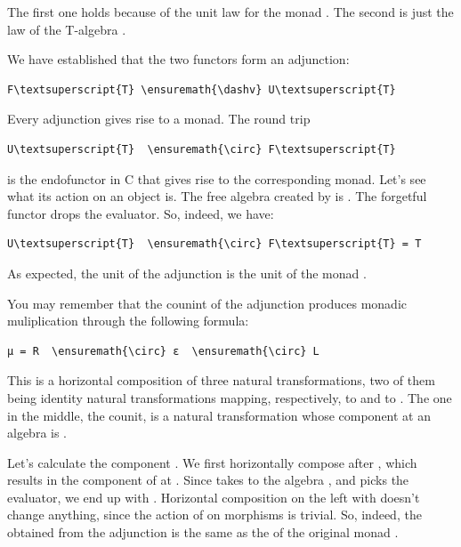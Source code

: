 \noindent
The first one holds because of the unit law for the monad .
The second is just the law of the T-algebra .

We have established that the two functors form an adjunction:

\begin{Verbatim}[commandchars=\\\{\}]
F\textsuperscript{T} \ensuremath{\dashv} U\textsuperscript{T}
\end{Verbatim}
Every adjunction gives rise to a monad. The round trip

\begin{Verbatim}[commandchars=\\\{\}]
U\textsuperscript{T}  \ensuremath{\circ} F\textsuperscript{T}
\end{Verbatim}
is the endofunctor in C that gives rise to the corresponding monad.
Let's see what its action on an object  is. The free algebra
created by  is . The forgetful functor
 drops the evaluator. So, indeed, we have:

\begin{Verbatim}[commandchars=\\\{\}]
U\textsuperscript{T}  \ensuremath{\circ} F\textsuperscript{T} = T
\end{Verbatim}
As expected, the unit of the adjunction is the unit of the monad
.

You may remember that the counint of the adjunction produces monadic
muliplication through the following formula:

\begin{Verbatim}[commandchars=\\\{\}]
μ = R  \ensuremath{\circ} ε  \ensuremath{\circ} L
\end{Verbatim}
This is a horizontal composition of three natural transformations, two
of them being identity natural transformations mapping, respectively,
 to  and  to . The one in the
middle, the counit, is a natural transformation whose component at an
algebra  is .

Let's calculate the component . We first horizontally compose
 after , which results in the component of
 at . Since  takes  to the
algebra , and  picks the evaluator, we end
up with . Horizontal composition on the left with 
doesn't change anything, since the action of  on morphisms is
trivial. So, indeed, the  obtained from the adjunction is the
same as the  of the original monad .

